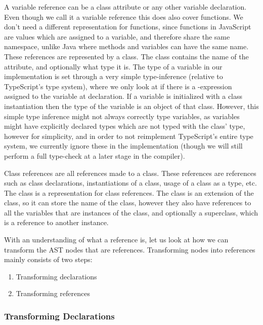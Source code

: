 A variable reference can be a class attribute or any other variable declaration.
Even though we call it a variable reference this does also cover functions.
We don't need a different representation for functions, since functions in JavaScript are values which are assigned to a variable, and therefore share the same namespace, unlike Java where methods and variables can have the same name.
These references are represented by a  class.
The class contains the name of the attribute, and optionally what type it is.
The type of a variable in our implementation is set through a very simple type-inference (relative to TypeScript's type system), where we only look at if there is a -expression assigned to the variable at declaration.
If a variable is initialized with a class instantiation then the type of the variable is an object of that class.
However, this simple type inference might not always correctly type variables, as variables might have explicitly declared types which are not typed with the class' type, however for simplicity, and in order to not reimplement TypeScript's entire type system, we currently ignore these in the implementation (though we will still perform a full type-check at a later stage in the compiler).

Class references are all references made to a class.
These references are references such as class declarations, instantiations of a class, usage of a class as a type, etc.
The  class is a representation for class references.
The class is an extension of the  class, so it can store the name of the class, however they also have references to all the variables that are instances of the class, and optionally a superclass, which is a reference to another  instance.

With an understanding of what a reference is, let us look at how we can transform the AST nodes that are references.
Transforming nodes into references mainly consists of two steps:

\begin{enumerate}
    \item Transforming declarations
    \item Transforming references
\end{enumerate}

\subsubsection{Transforming Declarations}

